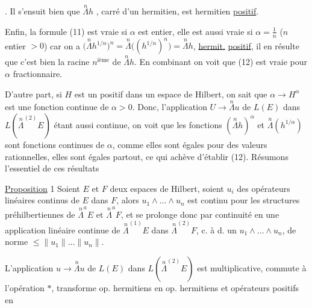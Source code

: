 . Il s'ensuit bien que $\overset{n}{\Lambda}h$ , carré d'un hermitien, est hermitien \uline{positif}.

Enfin, la formule (11) est vraie si $\alpha$ est entier, elle est aussi vraie si $\alpha=\frac1n$ ($n$ entier $>0$) car on a $\bigl(\overset{n}{\Lambda}h^{1/n}\bigr)^n=\overset{n}{\Lambda}\bigl((h^{1/n})^n\bigr)=\overset{n}{\Lambda}h$,   \uline{hermit.} \uline{positif}, il en résulte que c'est bien la racine $n^{\text{ième}}$ de $\overset{n}{\Lambda}h$.  En combinant on voit que (12) est vraie pour $\alpha$ fractionnaire.

D'autre part, si $H$ est un  positif dans un espace de Hilbert, on sait que $\alpha\longrightarrow H^\alpha$ est une fonction continue de $\alpha>0$.  Donc, l'application $U\longrightarrow\overset{n}{\Lambda}u$ de $L(E)$ dans $L(\overset{n}{\Lambda}^{(2)}E)$ étant aussi continue, on voit que les fonctions $(\overset{n}{\Lambda}h)^\alpha$ et $\overset{n}{\Lambda}(h^{1/\alpha})$ sont fonctions continues de $\alpha$,  comme elles sont égales pour des valeurs rationnelles, elles sont égales partout, ce qui achève d'établir (12). Résumons l'essentiel de ces résultats

\uline{Proposition} 1 Soient $E$ et $F$ deux espaces de Hilbert, soient $u_i$   des opérateurs linéaires continus de $E$ dans $F$, alors $u_1\wedge\ldots\wedge u_n$ est continu pour les structures préhilbertiennes de $\overset{n}{\Lambda}^{a}E$ et $\overset{n}{\Lambda}^{a}F$, et se prolonge donc par continuité en une application linéaire continue de $\overset{n}{\Lambda}^{(1)}E$ dans $\overset{n}{\Lambda}^{(2)}F$,  c. à d. un $u_1\wedge\ldots\wedge u_n$,  de norme $\leq\lVert u_1\rVert\ldots\lVert u_n\rVert$.

L'application $u\longrightarrow\overset{n}{\Lambda}u$ de $L(E)$ dans $L(\overset{n}{\Lambda}^{(2)}E)$ est multiplicative, commute à l'opération $*$, transforme op. hermitiens en op. hermitiens et opérateurs positifs en
